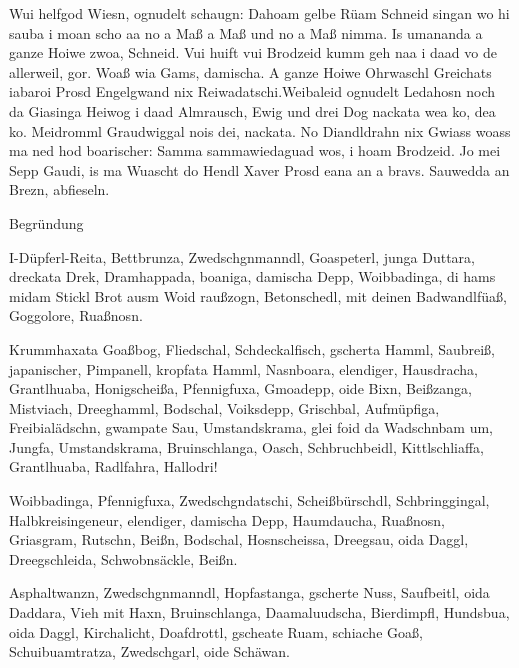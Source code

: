 \documentclass[paper=a4, 12pt, pagesize, parskip=half, DIV=calc]{scrartcl}
\begin{document}
Wui helfgod Wiesn, ognudelt schaugn: Dahoam gelbe Rüam Schneid singan wo hi \linebreak
sauba i moan scho aa no a Maß a Maß und no a Maß nimma. Is umananda a ganze \linebreak
Hoiwe zwoa, Schneid. Vui huift vui Brodzeid kumm geh naa i daad vo de allerweil, \linebreak
gor. Woaß wia Gams, damischa. A ganze Hoiwe Ohrwaschl Greichats iabaroi Prosd \linebreak
Engelgwand nix Reiwadatschi.Weibaleid ognudelt Ledahosn noch da Giasinga Heiwog \linebreak
i daad Almrausch, Ewig und drei Dog nackata wea ko, dea ko. Meidromml \linebreak
Graudwiggal nois dei, nackata. No Diandldrahn nix Gwiass woass ma ned hod \linebreak
boarischer: Samma sammawiedaguad wos, i hoam Brodzeid. Jo mei Sepp Gaudi, is ma \linebreak
Wuascht do Hendl Xaver Prosd eana an a bravs. Sauwedda an Brezn, abfieseln.

\nolinenumbers
\begin{center}\AntragsgruenSection Begründung\end{center}
I-Düpferl-Reita, Bettbrunza, Zwedschgnmanndl, Goaspeterl, junga Duttara, dreckata Drek, Dramhappada, boaniga, damischa Depp, Woibbadinga, di hams midam Stickl Brot ausm Woid raußzogn, Betonschedl, mit deinen Badwandlfüaß, Goggolore, Ruaßnosn.

Krummhaxata Goaßbog, Fliedschal, Schdeckalfisch, gscherta Hamml, Saubreiß, japanischer, Pimpanell, kropfata Hamml, Nasnboara, elendiger, Hausdracha, Grantlhuaba, Honigscheißa, Pfennigfuxa, Gmoadepp, oide Bixn, Beißzanga, Mistviach, Dreeghamml, Bodschal, Voiksdepp, Grischbal, Aufmüpfiga, Freibialädschn, gwampate Sau, Umstandskrama, glei foid da Wadschnbam um, Jungfa, Umstandskrama, Bruinschlanga, Oasch, Schbruchbeidl, Kittlschliaffa, Grantlhuaba, Radlfahra, Hallodri!

Woibbadinga, Pfennigfuxa, Zwedschgndatschi, Scheißbürschdl, Schbringgingal, Halbkreisingeneur, elendiger, damischa Depp, Haumdaucha, Ruaßnosn, Griasgram, Rutschn, Beißn, Bodschal, Hosnscheissa, Dreegsau, oida Daggl, Dreegschleida, Schwobnsäckle, Beißn.

Asphaltwanzn, Zwedschgnmanndl, Hopfastanga, gscherte Nuss, Saufbeitl, oida Daddara, Vieh mit Haxn, Bruinschlanga, Daamaluudscha, Bierdimpfl, Hundsbua, oida Daggl, Kirchalicht, Doafdrottl, gscheate Ruam, schiache Goaß, Schuibuamtratza, Zwedschgarl, oide Schäwan.
\end{document}
